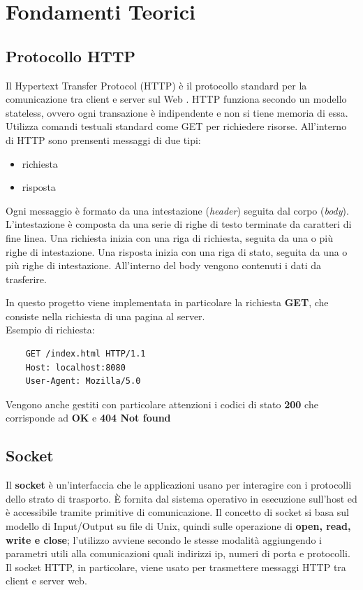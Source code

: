 \documentclass[a4paper,12pt]{report}
\begin{document}
\chapter{Fondamenti Teorici}
\section{Protocollo HTTP}
Il Hypertext Transfer Protocol (HTTP) è il protocollo standard per la comunicazione tra client e server sul Web . HTTP funziona secondo
un modello stateless, ovvero ogni transazione è indipendente e non si tiene memoria di essa. Utilizza comandi testuali standard come 
GET per richiedere risorse. All'interno di HTTP sono prensenti messaggi di due tipi:
\begin{itemize}
    \item richiesta
    \item risposta
\end{itemize}
Ogni messaggio è formato da una intestazione (\emph{header}) seguita dal corpo (\emph{body}). L'intestazione è composta da una serie di righe di testo
terminate da caratteri di fine linea. Una richiesta inizia con una riga di richiesta, seguita da una o più righe di intestazione. Una 
risposta inizia con una riga di stato, seguita da una o più righe di intestazione. All'interno del body vengono contenuti i dati da 
trasferire. 

In questo progetto viene implementata in particolare la richiesta \textbf{GET}, che consiste nella richiesta di una pagina al server. \\Esempio di 
richiesta:
\begin{verbatim}
    GET /index.html HTTP/1.1
    Host: localhost:8080
    User-Agent: Mozilla/5.0
\end{verbatim}
    
Vengono anche gestiti con particolare attenzioni i codici di stato \textbf{200} che corrisponde ad \textbf{OK} e \textbf{404 Not found}
\section{Socket}
Il \textbf{socket} è un'interfaccia che le applicazioni usano per interagire con i protocolli dello strato di trasporto. 
È fornita dal sistema operativo in esecuzione sull'host ed è accessibile tramite primitive di comunicazione. Il concetto di socket si basa
sul modello di Input/Output su file di Unix, quindi sulle operazione di \textbf{open, read, write e close}; l’utilizzo avviene secondo le stesse 
modalità aggiungendo i parametri utili alla comunicazioni quali indirizzi ip, numeri di porta e protocolli. 
Il socket HTTP, in particolare, viene usato per trasmettere messaggi HTTP tra client e server web.
\end{document}
